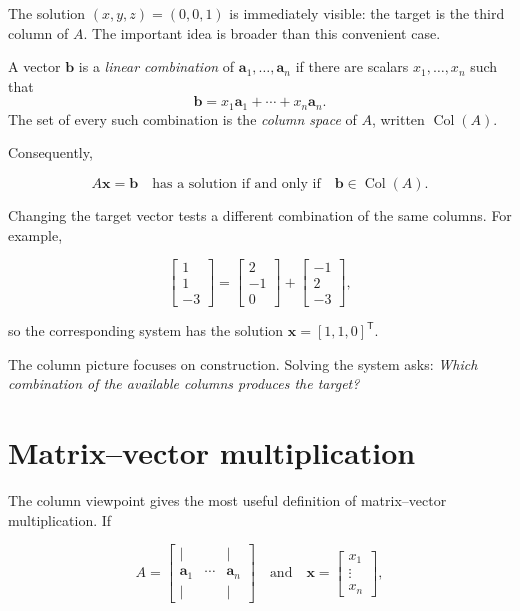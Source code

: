 The solution \((x,y,z)=(0,0,1)\) is immediately visible: the target is the
third column of \(A\). The important idea is broader than this convenient
case.

\begin{definition}
A vector \(\mathbf{b}\) is a \emph{linear combination} of
\(\mathbf{a}_1,\ldots,\mathbf{a}_n\) if there are scalars
\(x_1,\ldots,x_n\) such that
\[
    \mathbf{b}=x_1\mathbf{a}_1+\cdots+x_n\mathbf{a}_n.
\]
The set of every such combination is the \emph{column space} of \(A\),
written \(\operatorname{Col}(A)\).
\end{definition}

Consequently,

\[
    A\mathbf{x}=\mathbf{b}
    \quad\text{has a solution if and only if}\quad
    \mathbf{b}\in\operatorname{Col}(A).
\]

Changing the target vector tests a different combination of the same columns.
For example,

\[
    \begin{bmatrix}1\\1\\-3\end{bmatrix}
    =
    \begin{bmatrix}2\\-1\\0\end{bmatrix}
    +
    \begin{bmatrix}-1\\2\\-3\end{bmatrix},
\]

so the corresponding system has the solution
\(\mathbf{x}=[1,1,0]^{\mathsf T}\).

\begin{remark}
The column picture focuses on construction. Solving the system asks:
\emph{Which combination of the available columns produces the target?}
\end{remark}

\section{Matrix--vector multiplication}

The column viewpoint gives the most useful definition of matrix--vector
multiplication. If

\[
    A=\begin{bmatrix}\vert&&\vert\\
    \mathbf{a}_1&\cdots&\mathbf{a}_n\\
    \vert&&\vert\end{bmatrix}
    \quad\text{and}\quad
    \mathbf{x}=\begin{bmatrix}x_1\\\vdots\\x_n\end{bmatrix},
\]

